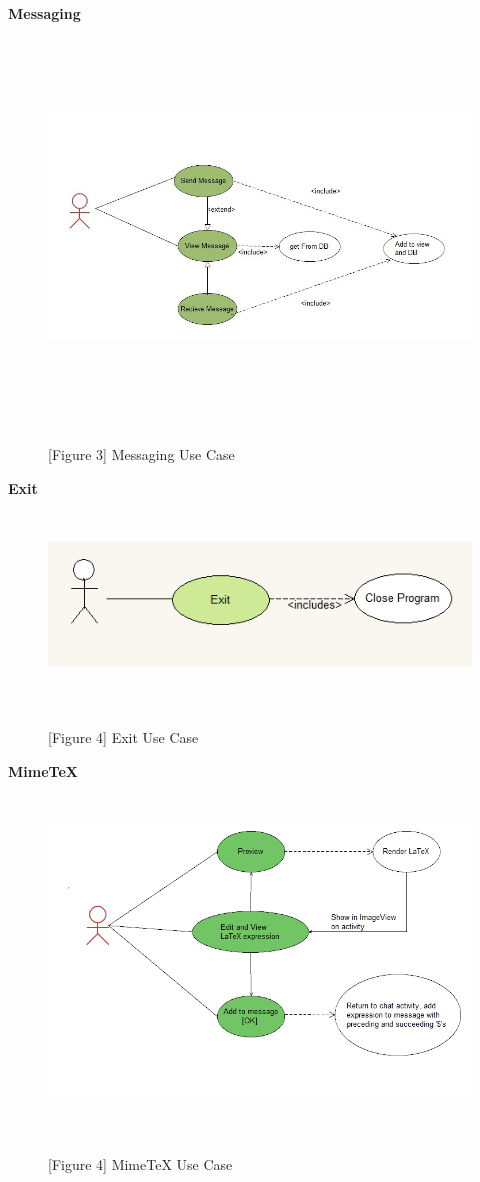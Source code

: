\documentclass[29pt,a4paper]{moderncv}
\begin{document}
		\noindent \left\textbf{Messaging}\\
		\begin{figure}
			\centering
			\\ \includegraphics[width=6.0in, height=3.5in]{./messagingUseCase.jpg}
			\\\caption{[Figure 3] Messaging Use Case}\\
		\end{figure}
\newpage		
		\noindent \left\textbf{Exit}\\
		\begin{figure}
			\centering
			\\ \includegraphics[width=6.0in, height=1.5in]{./exitCase.png}
			\\\caption{[Figure 4] Exit Use Case}\\
		\end{figure}
		
\newpage		
		\noindent \left\textbf{MimeTeX}\\
		\begin{figure}
			\centering
			\\ \includegraphics[width=6.0in, height=3.0in]{./MimeTeXUseCase.png}
			\\\caption{[Figure 4] MimeTeX Use Case}\\
		\end{figure}
		
\end{document}
